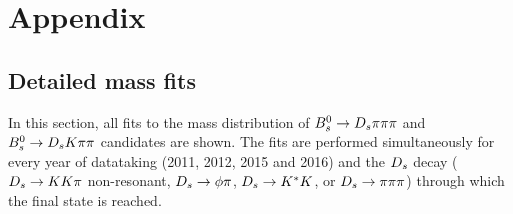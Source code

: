 \section{Appendix}
\label{sec:Appendix}


\subsection{Detailed mass fits}
\label{subsec:DetailedMassfits}

In this section, all fits to the mass distribution of $\Bs\to\Ds\pion\pion\pion$ and $\Bs\to\Ds\kaon\pion\pion$ candidates are shown. 
The fits are performed simultaneously for every year of datataking (2011, 2012, 2015 and 2016) 
and the $\Ds$ decay ($\Ds\to\kaon\kaon\pion$ non-resonant, $\Ds\to\phi\pi$, $\Ds\to\Kstar\kaon$, or $\Ds\to\pion\pion\pion$) through which the final state is reached.    

